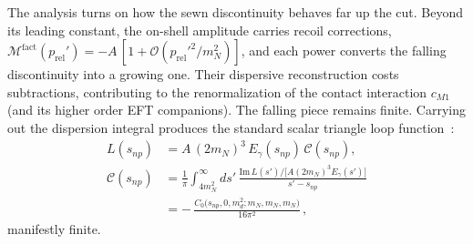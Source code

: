 \documentclass[
  aps,prd,twocolumn,nofootinbib,superscriptaddress,
  longbibliography,floatfix,preprintnumbers
]{revtex4-2}
\newcommand{\prel}{p_{\mathrm{rel}}}
\newcommand{\Egam}{E_{\gamma}}
\newcommand{\Mone}{M1}
\begin{document}
The analysis turns on how the sewn discontinuity behaves
far up the cut. Beyond its leading constant, the on-shell amplitude
carries recoil corrections,
$\mathcal{M}^{\mathrm{fact}}(\prel')
= -A\,[1+\mathcal{O}(\prel'^{2}/m_{N}^{2})]$,
and each power converts the falling discontinuity into a growing one.
Their dispersive reconstruction costs subtractions, contributing to the renormalization of the contact interaction $c_{\Mone}$ (and its higher order EFT companions). The
falling piece remains finite.  Carrying out the dispersion integral produces the standard scalar triangle loop function~\cite{tHooft:1978xw}:
\begin{equation}
\begin{split}
  L(s_{np}) &= A\,(2m_{N})^{3}\,\Egam(s_{np})\,\mathcal{C}(s_{np}),\\
  \mathcal{C}(s_{np})
  &= \frac{1}{\pi}\int_{4m_{N}^{2}}^{\infty}\!\!ds'\,
     \frac{\mathrm{Im}\,L(s')/\big[A(2m_{N})^{3}\Egam(s')\big]}{s'-s_{np}}\\
  &= -\,\frac{C_{0}\big(s_{np},0,m_{d}^{2};m_{N},m_{N},m_{N}\big)}
             {16\pi^{2}}\,,
\end{split}
  \label{eq:Cdisp}
\end{equation}
manifestly finite.
\end{document}
